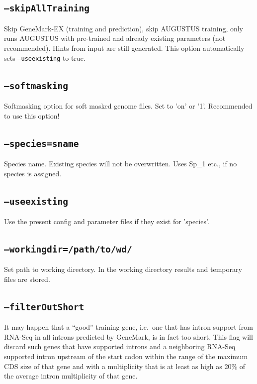 \documentclass[a4paper,10pt]{report}
\begin{document}
\subsection{\texttt{--skipAllTraining}}                    Skip GeneMark-EX (training and prediction), skip AUGUSTUS training,
                                         only runs AUGUSTUS with pre-trained and already
                                         existing parameters (not recommended). Hints from input are still generated.
                                         This option automatically sets \texttt{--useexisting} to true.
    \subsection{\texttt{--softmasking}}                        Softmasking option for soft masked genome files. Set to 'on' or '1'. Recommended to use this option!
    \subsection{\texttt{--species=sname}}                      Species name. Existing species will not be overwritten. 
                                         Uses Sp\_1 etc., if no species is assigned.                          
    \subsection{\texttt{--useexisting}}                        Use the present config and parameter files if they exist for 
                                         'species'.
    \subsection{\texttt{--workingdir=/path/to/wd/}}            Set path to working directory. In the working directory results
                                         and temporary files are stored.
    \subsection{\texttt{--filterOutShort}}                     It may happen that a ``good'' training gene, i.e.~one that has intron
                                         support from RNA-Seq in all introns predicted by GeneMark, is in fact
                                         too short. This flag will discard such genes that have supported introns
                                         and a neighboring RNA-Seq supported intron upstream of the start codon 
                                         within the range of the maximum CDS size of that gene and with a 
                                         multiplicity that is at least as high as 20\% of the average intron 
                                         multiplicity of that gene.
\end{document}
